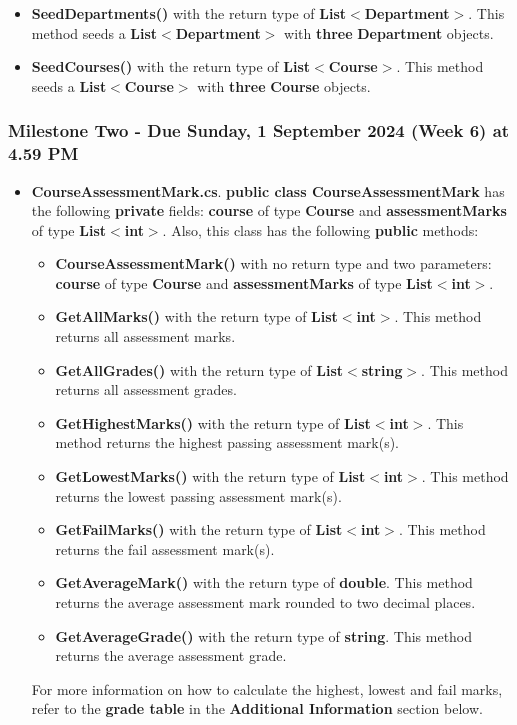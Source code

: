 \documentclass{article}
\begin{document}
\begin{itemize}
\begin{itemize}
        \item \textbf{SeedDepartments()} with the return type of \textbf{List$<$Department$>$}. This method seeds a \textbf{List$<$Department$>$} with \textbf{three} \textbf{Department} objects.
        \item \textbf{SeedCourses()} with the return type of \textbf{List$<$Course$>$}. This method seeds a \textbf{List$<$Course$>$} with \textbf{three} \textbf{Course} objects.
    \end{itemize}
\end{itemize}

\subsubsection*{Milestone Two - Due Sunday, 1 September 2024 (Week 6) at 4.59 PM}

\begin{itemize}
    \item \textbf{CourseAssessmentMark.cs}. \textbf{public class CourseAssessmentMark} has the following \textbf{private} fields: \textbf{course} of type \textbf{Course} and \textbf{assessmentMarks} of type \textbf{List$<$int$>$}. Also, this class has the following \textbf{public} methods:
    \begin{itemize}
        \item \textbf{CourseAssessmentMark()} with no return type and two parameters: \textbf{course} of type \textbf{Course} and \textbf{assessmentMarks} of type \textbf{List$<$int$>$}. 
        \item \textbf{GetAllMarks()} with the return type of \textbf{List$<$int$>$}. This method returns all assessment marks.
        \item \textbf{GetAllGrades()} with the return type of \textbf{List$<$string$>$}. This method returns all assessment grades.
        \item \textbf{GetHighestMarks()} with the return type of \textbf{List$<$int$>$}. This method returns the highest passing assessment mark(s).
        \item \textbf{GetLowestMarks()} with the return type of \textbf{List$<$int$>$}. This method returns the lowest passing assessment mark(s). 
        \item \textbf{GetFailMarks()} with the return type of \textbf{List$<$int$>$}. This method returns the fail assessment mark(s).
        \item \textbf{GetAverageMark()} with the return type of \textbf{double}. This method returns the average assessment mark rounded to two decimal places.
        \item \textbf{GetAverageGrade()} with the return type of \textbf{string}. This method returns the average assessment grade.
    \end{itemize}
    For more information on how to calculate the highest, lowest and fail marks, refer to the \textbf{grade table} in the \textbf{Additional Information} section below.
\end{itemize}
\end{document}
